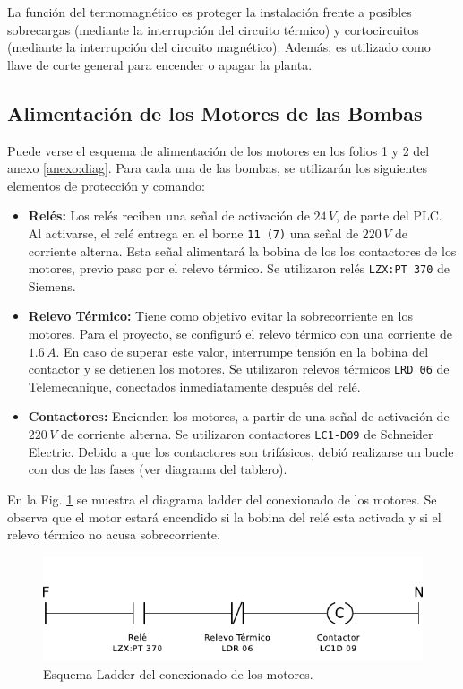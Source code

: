 La función del termomagnético es proteger la instalación frente a posibles
sobrecargas (mediante la interrupción del circuito térmico) y cortocircuitos
(mediante la interrupción del circuito magnético).
Además, es utilizado como llave de corte general para encender o apagar la
planta.

\subsection{Alimentación de los Motores de las Bombas}
\label{subsec:alimentacionMotores}
Puede verse el esquema de alimentación de los motores en los folios 1 y 2 del
anexo \ref{anexo:diag}.
Para cada una de las bombas, se utilizarán los siguientes elementos de
protección y comando:
\begin{itemize}
 \item \textbf{Relés:}
 Los relés reciben una señal de activación de $24\,V$, de parte del PLC.
 Al activarse, el relé entrega en el borne \verb|11 (7)| una señal de $220\,V$
de corriente alterna.
Esta señal alimentará la bobina de los los contactores de los motores, previo 
paso por el relevo térmico. Se utilizaron relés \verb|LZX:PT 370| de Siemens.
 \item \textbf{Relevo Térmico:}
 Tiene como objetivo evitar la sobrecorriente en los motores.
 Para el proyecto, se configuró el relevo térmico con una corriente
 de $1.6\,A$.
 En caso de superar este valor, interrumpe tensión en la bobina
 del contactor y se detienen los motores.
 Se utilizaron relevos térmicos \verb|LRD 06| de Telemecanique, conectados
inmediatamente después del relé.
 \item \textbf{Contactores:}
 Encienden los motores, a partir de una señal de activación de $220\,V$ de
corriente alterna.
Se utilizaron contactores \verb|LC1-D09| de Schneider Electric.
Debido a que los contactores son trifásicos, debió realizarse un bucle con dos
de las fases (ver diagrama del tablero).
\end{itemize}

En la Fig. \ref{fig:diagramaLadderContactor} se muestra el diagrama ladder
del conexionado de los motores.
Se observa que  el motor estará encendido si la bobina del relé esta activada y
si el relevo térmico no acusa sobrecorriente.

\begin{figure}
 \centering
 \includegraphics[scale=1.1]{Cap3-TableroElectrico/Images/ladderConexion.pdf}
 \caption{Esquema Ladder del conexionado de los motores.}
 \label{fig:diagramaLadderContactor}
\end{figure}

